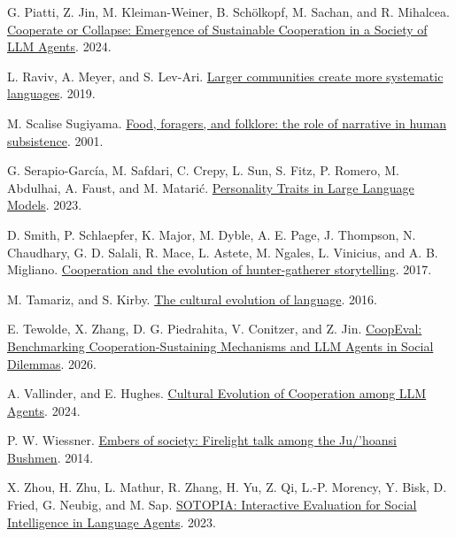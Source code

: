 \documentclass[
  10pt,
  letterpaper,
]{article}
\newlength{\cslhangindent}
\newenvironment{CSLReferences}[2] %
 {\begin{list}{}{%
  \setlength{\itemindent}{0pt}
  \setlength{\leftmargin}{0pt}
  \setlength{\parsep}{0pt}
  \ifodd #1
   \setlength{\leftmargin}{\cslhangindent}
   \setlength{\itemindent}{-1\cslhangindent}
  \fi
  \setlength{\itemsep}{#2\baselineskip}}}
 {\end{list}}
\begin{document}
\begin{CSLReferences}{1}{0}
G. Piatti, Z. Jin, M. Kleiman-Weiner, B. Schölkopf, M. Sachan, and R.
Mihalcea. \href{https://doi.org/10.48550/ARXIV.2404.16698}{Cooperate or
Collapse: Emergence of Sustainable Cooperation in a Society of LLM
Agents}. 2024.

L. Raviv, A. Meyer, and S. Lev-Ari.
\href{https://doi.org/10.1098/rspb.2019.1262}{Larger communities create
more systematic languages}. 2019.

M. Scalise Sugiyama.
\href{https://doi.org/10.1016/s1090-5138(01)00063-0}{Food, foragers, and
folklore: the role of narrative in human subsistence}. 2001.

G. Serapio-García, M. Safdari, C. Crepy, L. Sun, S. Fitz, P. Romero, M.
Abdulhai, A. Faust, and M. Matarić.
\href{https://doi.org/10.48550/ARXIV.2307.00184}{Personality Traits in
Large Language Models}. 2023.

D. Smith, P. Schlaepfer, K. Major, M. Dyble, A. E. Page, J. Thompson, N.
Chaudhary, G. D. Salali, R. Mace, L. Astete, M. Ngales, L. Vinicius, and
A. B. Migliano.
\href{https://doi.org/10.1038/s41467-017-02036-8}{Cooperation and the
evolution of hunter-gatherer storytelling}. 2017.

M. Tamariz, and S. Kirby.
\href{https://doi.org/10.1016/j.copsyc.2015.09.003}{The cultural
evolution of language}. 2016.

E. Tewolde, X. Zhang, D. G. Piedrahita, V. Conitzer, and Z. Jin.
\href{https://doi.org/10.48550/ARXIV.2604.15267}{CoopEval: Benchmarking
Cooperation-Sustaining Mechanisms and LLM Agents in Social Dilemmas}.
2026.

A. Vallinder, and E. Hughes.
\href{https://doi.org/10.48550/ARXIV.2412.10270}{Cultural Evolution of
Cooperation among LLM Agents}. 2024.

P. W. Wiessner. \href{https://doi.org/10.1073/pnas.1404212111}{Embers of
society: Firelight talk among the Ju/'hoansi Bushmen}. 2014.

X. Zhou, H. Zhu, L. Mathur, R. Zhang, H. Yu, Z. Qi, L.-P. Morency, Y.
Bisk, D. Fried, G. Neubig, and M. Sap.
\href{https://doi.org/10.48550/ARXIV.2310.11667}{SOTOPIA: Interactive
Evaluation for Social Intelligence in Language Agents}. 2023.

\end{CSLReferences}
\end{document}
